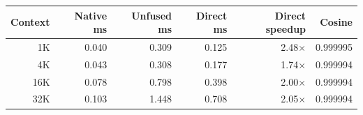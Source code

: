 \begin{tabular}{rrrrrr}
\toprule
Context & Native ms & Unfused ms & Direct ms & Direct speedup & Cosine \\
\midrule
1K & 0.040 & 0.309 & 0.125 & 2.48$\times$ & 0.999995 \\
4K & 0.043 & 0.308 & 0.177 & 1.74$\times$ & 0.999994 \\
16K & 0.078 & 0.798 & 0.398 & 2.00$\times$ & 0.999994 \\
32K & 0.103 & 1.448 & 0.708 & 2.05$\times$ & 0.999994 \\
\bottomrule
\end{tabular}
